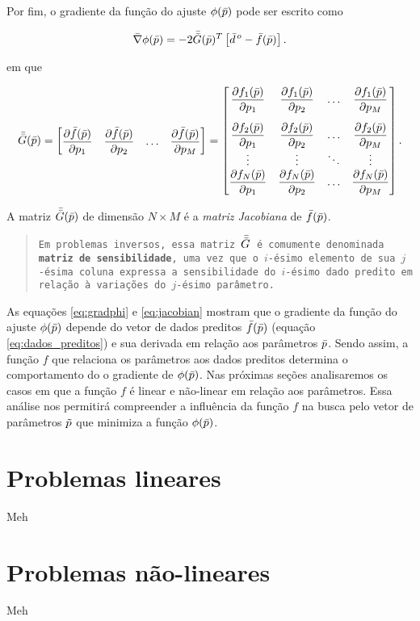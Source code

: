 \noindent Por fim, o gradiente da função do ajuste $\phi(\bar{p})$ pode ser
escrito como

\begin{equation}
\bar{\nabla} \phi(\bar{p}) = -2\bar{\bar{G}}(\bar{p})^T
    \left[\bar{d}^{\thinspace o} - \bar{f}(\bar{p})\right].
\label{eq:gradphi}
\end{equation}

\noindent em que 

\begin{equation}
\mat{G}(\vect{p}) = 
\begin{bmatrix}
    \dfrac{\partial\vect{f}(\vect{p})}{\partial p_1} &
    \dfrac{\partial\vect{f}(\vect{p})}{\partial p_2} &
    \ldots &
    \dfrac{\partial\vect{f}(\vect{p})}{\partial p_M}
\end{bmatrix}
=
\begin{bmatrix}
    \dfrac{\partial f_1(\vect{p})}{\partial p_1} &
        \dfrac{\partial f_1(\vect{p})}{\partial p_2} &
        \ldots &
        \dfrac{\partial f_1(\vect{p})}{\partial p_M}
    \vspace{0.3cm}\\
    \dfrac{\partial f_2(\vect{p})}{\partial p_1} &
        \dfrac{\partial f_2(\vect{p})}{\partial p_2} &
        \ldots & 
        \dfrac{\partial f_2(\vect{p})}{\partial p_M}
    \\
    \vdots & \vdots & \ddots & \vdots
    \\
    \dfrac{\partial f_N(\vect{p})}{\partial p_1} &
        \dfrac{\partial f_N(\vect{p})}{\partial p_2} &
        \ldots & 
        \dfrac{\partial f_N(\vect{p})}{\partial p_M}        
\end{bmatrix}.
\label{eq:jacobian}
\end{equation}

\noindent A matriz $\bar{\bar{G}}(\bar{p})$ de dimensão $N \times M$ é a
{\it matriz Jacobiana} de $\bar{f}(\bar{p})$.

\begin{quote}
{\tt Em problemas inversos, essa matriz $\bar{\bar{G}}$ é comumente denominada
{\bf matriz de sensibilidade}, uma vez que o $i$-ésimo elemento de sua $j$-ésima
coluna expressa a sensibilidade do $i$-ésimo dado pre\-di\-to em re\-la\-ção à variações
do $j$-ésimo parâmetro.}
\end{quote}

\indent As equações \ref{eq:gradphi} e \ref{eq:jacobian} mostram que o gradiente
da função do ajuste $\phi(\bar{p})$ depende do vetor de dados preditos
$\bar{f}(\bar{p})$ (equação \ref{eq:dados_preditos}) e sua derivada em relação
aos parâmetros $\bar{p}$.
Sendo assim, a função $f$ que relaciona os parâmetros aos dados preditos determina
o comportamento do o gradiente de $\phi(\bar{p})$.
Nas próximas seções analisaremos os casos em que a função $f$ é linear e
não-linear em relação aos parâmetros.
Essa análise nos permitirá compreender a influência da função $f$ na busca pelo
vetor de parâmetros $\tilde{p}$ que minimiza a função $\phi(\bar{p})$.

\section{Problemas lineares}

Meh

\section{Problemas não-lineares}

Meh

